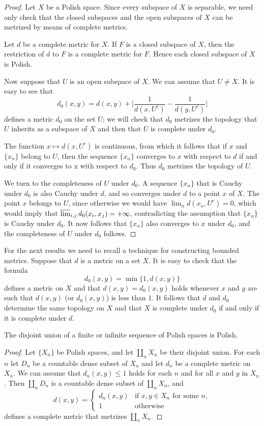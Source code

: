 \begin{proof}
Let $X$ be a Polish space. Since every subspace of $X$ is separable, we need only check that the closed subspaces and the open subspaces of $X$ can be metrized by means of complete metrics.\par
Let $d$ be a complete metric for $X$. If $F$ is a closed subspace of $X$, then the restriction of $d$ to $F$ is a complete metric for $F$. Hence each closed subspace of $X$ is Polish.\par
Now suppose that $U$ is an open subspace of $X$. We can assume that $U\neq X$. It is easy to see that
\[d_0(x,y)=d(x,y)+\Big|\frac{1}{d(x,U^c)}-\frac{1}{d(y,U^c)}\Big|\]
defines a metric $d_0$ on the set $U$; we will check that $d_0$ metrizes the topology that $U$ inherits as a subspace of $X$ and then that $U$ is complete under $d_0$.\par
The function $x\mapsto d(x,U^c)$ is continuous, from which it follows that if $x$ and $\{x_n\}$ belong to $U$, then the sequence $\{x_n\}$ converges to $x$ with respect to $d$ if and only if it converges to x with respect to $d_0$. Thus $d_0$ metrizes the topology of $U$.\par
We turn to the completeness of $U$ under $d_0$. A sequence $\{x_n\}$ that is Cauchy under $d_0$ is also Cauchy under $d$, and so converges under $d$ to a point $x$ of $X$. The point $x$ belongs to $U$, since otherwise we would have $\lim_nd(x_n,U^c)=0$, which would imply that $\varlimsup_{i,j}d_0(x_i,x_j)=+\infty$, contradicting the assumption that $\{x_n\}$ is Cauchy under $d_0$. It now follows that $\{x_n\}$ also converges to $x$ under $d_0$, and the completeness of $U$ under $d_0$ follows.
\end{proof}
For the next results we need to recall a technique for constructing bounded
metrics. Suppose that $d$ is a metric on a set $X$. It is easy to check that the formula
\[d_0(x,y)=\min\{1,d(x,y)\}\]
defines a metric on $X$ and that $d(x,y)=d_0(x,y)$ holds whenever $x$ and $y$ are such that $d(x,y)$ (or $d_0(x,y)$) is less than $1$. It follows that $d$ and $d_0$ determine the same topology on $X$ and that $X$ is complete under $d_0$ if and only if it is complete under $d$.
\begin{proposition}\label{Polish disjoint union}
The disjoint union of a finite or infinite sequence of Polish spaces is Polish.
\end{proposition}
\begin{proof}
Let $\{X_n\}$ be Polish spaces, and let $\coprod_nX_n$ be their disjoint union. For each $n$ let $D_n$ be a countable dense subset of $X_n$ and let $d_n$ be a complete metric on $X_n$. We can assume that $d_n(x,y)\leq 1$ holds for each $n$ and for all $x$ and $y$ in $X_n$. Then $\coprod_nD_n$ is a countable dense subset of $\coprod_nX_n$, and
\[d(x,y)=\begin{cases}
d_n(x,y)&\text{if $x,y\in X_n$ for some $n$},\\
1&\text{otherwise}
\end{cases}\]
defines a complete metric that metrizes $\coprod_nX_n$.
\end{proof}
